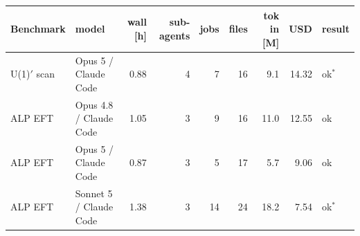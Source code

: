 \begin{tabular}{llrrrrrrl}
\toprule
Benchmark & model & wall [h] & sub-agents & jobs & files & tok in [M] & USD & result \\
\midrule
U(1)$'$ scan & Opus 5 / Claude Code & 0.88 & 4 & 7 & 16 & 9.1 & 14.32 & ok$^{*}$ \\
ALP EFT & Opus 4.8 / Claude Code & 1.05 & 3 & 9 & 16 & 11.0 & 12.55 & ok \\
ALP EFT & Opus 5 / Claude Code & 0.87 & 3 & 5 & 17 & 5.7 & 9.06 & ok \\
ALP EFT & Sonnet 5 / Claude Code & 1.38 & 3 & 14 & 24 & 18.2 & 7.54 & ok$^{*}$ \\
\bottomrule
\end{tabular}
